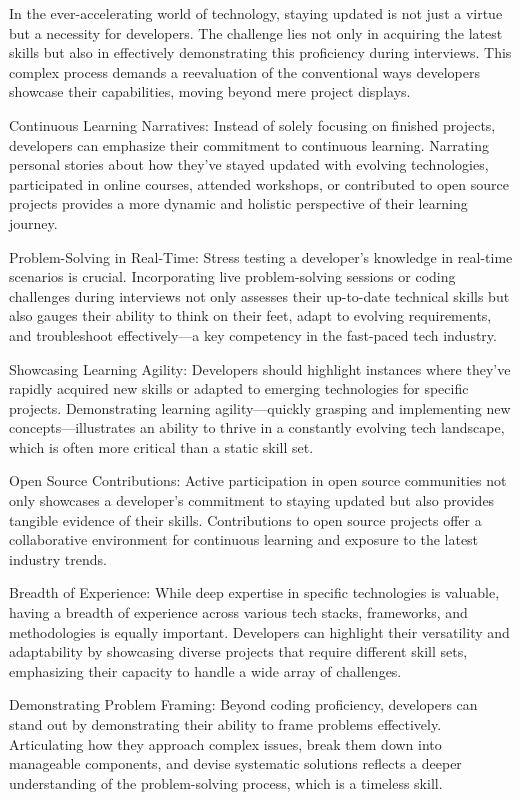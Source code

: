 \documentclass[
    a4paper, %
    10pt, %
    unnumberedsections, %
    twoside, %
]{LTJournalArticle}
\begin{document}
In the ever-accelerating world of technology, staying updated is not just a virtue but a necessity for developers. The challenge lies not only in acquiring the latest skills but also in effectively demonstrating this proficiency during interviews. This complex process demands a reevaluation of the conventional ways developers showcase their capabilities, moving beyond mere project displays.

Continuous Learning Narratives:
Instead of solely focusing on finished projects, developers can emphasize their commitment to continuous learning. Narrating personal stories about how they've stayed updated with evolving technologies, participated in online courses, attended workshops, or contributed to open source projects provides a more dynamic and holistic perspective of their learning journey.

Problem-Solving in Real-Time:
Stress testing a developer's knowledge in real-time scenarios is crucial. Incorporating live problem-solving sessions or coding challenges during interviews not only assesses their up-to-date technical skills but also gauges their ability to think on their feet, adapt to evolving requirements, and troubleshoot effectively—a key competency in the fast-paced tech industry.

Showcasing Learning Agility:
Developers should highlight instances where they've rapidly acquired new skills or adapted to emerging technologies for specific projects. Demonstrating learning agility—quickly grasping and implementing new concepts—illustrates an ability to thrive in a constantly evolving tech landscape, which is often more critical than a static skill set.

Open Source Contributions:
Active participation in open source communities not only showcases a developer's commitment to staying updated but also provides tangible evidence of their skills. Contributions to open source projects offer a collaborative environment for continuous learning and exposure to the latest industry trends.

Breadth of Experience:
While deep expertise in specific technologies is valuable, having a breadth of experience across various tech stacks, frameworks, and methodologies is equally important. Developers can highlight their versatility and adaptability by showcasing diverse projects that require different skill sets, emphasizing their capacity to handle a wide array of challenges.

Demonstrating Problem Framing:
Beyond coding proficiency, developers can stand out by demonstrating their ability to frame problems effectively. Articulating how they approach complex issues, break them down into manageable components, and devise systematic solutions reflects a deeper understanding of the problem-solving process, which is a timeless skill.
\end{document}
